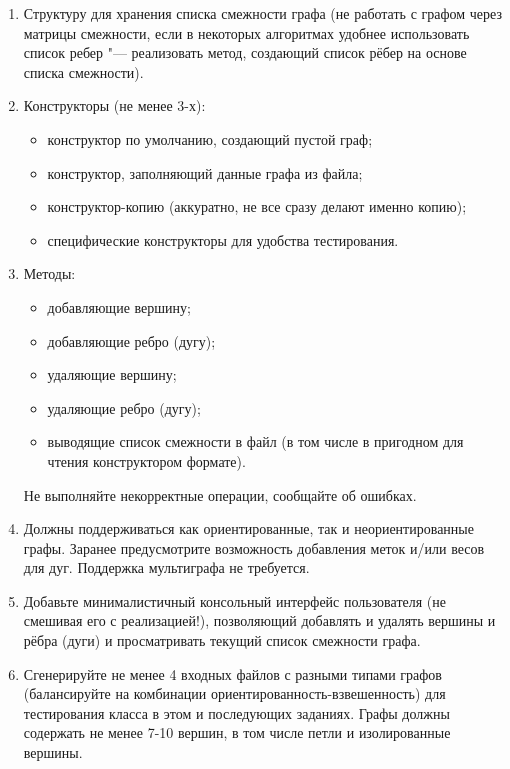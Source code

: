 \documentclass[pract]{SCWorks}
\begin{document}
    \begin{enumerate}
        \item Структуру для хранения списка смежности графа (не работать с графом через матрицы смежности, если в некоторых алгоритмах удобнее использовать список ребер "--- реализовать метод, создающий список рёбер на основе списка смежности).

        \item Конструкторы (не менее 3-х):
        \begin{itemize}
            \item конструктор по умолчанию, создающий пустой граф;
            \item конструктор, заполняющий данные графа из файла;
            \item конструктор-копию (аккуратно, не все сразу делают именно копию);
            \item специфические конструкторы для удобства тестирования.
        \end{itemize}

        \item Методы:
        \begin{itemize}
            \item добавляющие вершину;
            \item добавляющие ребро (дугу);
            \item удаляющие вершину;
            \item удаляющие ребро (дугу);
            \item выводящие список смежности в файл (в том числе в пригодном для чтения конструктором формате).
        \end{itemize}
        Не выполняйте некорректные операции, сообщайте об ошибках.

        \item Должны поддерживаться как ориентированные, так и неориентированные графы.
        Заранее предусмотрите возможность добавления меток и/или весов для дуг.
        Поддержка мультиграфа не требуется.

        \item Добавьте минималистичный консольный интерфейс пользователя (не смешивая его с реализацией!), позволяющий добавлять и удалять вершины и рёбра (дуги) и просматривать текущий список смежности графа.

        \item Сгенерируйте не менее 4 входных файлов с разными типами графов (балансируйте на комбинации ориентированность-взвешенность) для тестирования класса в этом и последующих заданиях.
        Графы должны содержать не менее 7-10 вершин, в том числе петли и изолированные вершины.
    \end{enumerate}
\end{document}
